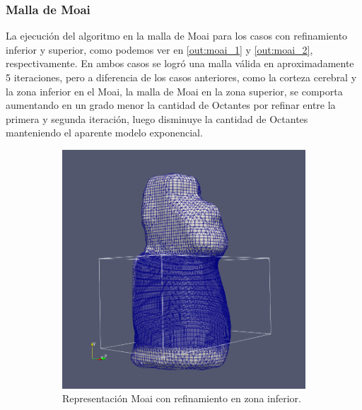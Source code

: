 \subsubsection{Malla de Moai}

La ejecución del algoritmo en la malla de Moai para los casos con refinamiento inferior y superior, como podemos ver en \autoref{out:moai_1} y \autoref{out:moai_2}, respectivamente. En ambos casos se logró una malla válida en aproximadamente 5 iteraciones, pero a diferencia de los casos anteriores, como la corteza cerebral y la zona inferior en el Moai, la malla de Moai en la zona superior, se comporta aumentando en un grado menor la cantidad de Octantes por refinar entre la primera y segunda iteración, luego disminuye la cantidad de Octantes manteniendo el aparente modelo exponencial.

\begin{figure}[!ht]
    \centering
    \begin{subfigure}[t]{0.45\textwidth}
        \includegraphics[width=1.0\textwidth]{figures/meshes/moai_5r7_01.png}
        \caption{Representación Moai con refinamiento en zona inferior.}
    \end{subfigure}
    \begin{subfigure}[t]{0.45\textwidth}

\end{subfigure}
\end{figure}
